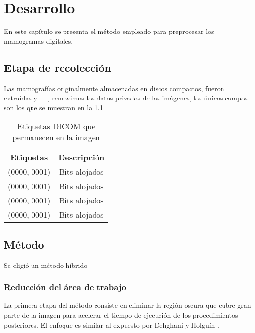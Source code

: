 \chapter{Desarrollo}
\label{desarrollo}

En este capítulo se presenta el método empleado para preprocesar los mamogramas
digitales.

\shorthandoff{>} %
    
\shorthandon{>} 

\section{Etapa de recolección}
Las mamografías originalmente almacenadas en discos compactos, fueron extraídas
y ... , removimos los datos privados de las imágenes, los únicos campos son los
que se muestran en la \ref{table:dicomtags} 

\begin{table}[h]
  \caption{Etiquetas DICOM que permanecen en la imagen} 
  \label{table:dicomtags}
\begin{center}
{\small
    \begin{tabular}{c|c}
    \hline

    {\bf Etiquetas} & 
    {\bf Descripción} \\
    \hline
           (0000, 0001) & Bits alojados \\
           (0000, 0001) & Bits alojados \\
           (0000, 0001) & Bits alojados \\
           (0000, 0001) & Bits alojados \\
    \hline
    \end{tabular}
}
\end{center}
\end{table}


\section{Método}
Se eligió un método híbrido

\subsection{Reducción del área de trabajo}

La primera etapa del método consiste en eliminar la región oscura que cubre
gran parte de la imagen para acelerar el tiempo de ejecución de los
procedimientos posteriores. El enfoque es similar al expuesto por Dehghani y
Holguín \cite{dehghani2011method, holguinpre}.

